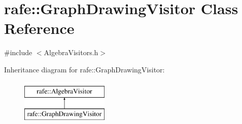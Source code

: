 \hypertarget{classrafe_1_1_graph_drawing_visitor}{\section{rafe\+:\+:Graph\+Drawing\+Visitor Class Reference}
\label{classrafe_1_1_graph_drawing_visitor}
}


{\ttfamily \#include $<$Algebra\+Visitors.\+h$>$}

Inheritance diagram for rafe\+:\+:Graph\+Drawing\+Visitor\+:\begin{figure}[H]
\begin{center}
\leavevmode
\includegraphics[height=2.000000cm]{classrafe_1_1_graph_drawing_visitor}
\end{center}
\end{figure}
